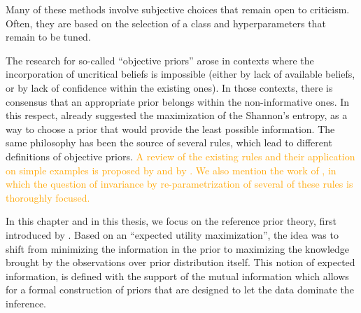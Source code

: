 Many of these  methods involve subjective choices that remain open to criticism. Often, they are based on the selection of a class and hyperparameters that remain to be tuned.

The research for so-called ``objective priors'' arose in contexts where the incorporation of uncritical beliefs is impossible (either by lack of available beliefs, or by lack of confidence within the existing ones).
In those contexts, there is consensus that an appropriate prior belongs within the non-informative ones. In this respect, \citet{lindley_measure_1956} already suggested the maximization of the Shannon's entropy, as a way to choose a prior that would provide the least possible information.
The same philosophy has been the source of several rules, which lead to different definitions of objective priors. \textcolor{orange}{A review of the  existing rules and their application on simple examples is proposed by \cite{kass_selection_1996} and by \citet{berger_overall_2015}. We also mention the work of  \citet{datta_invariance_1996}, in which the question of invariance by re-parametrization of several of these rules is thoroughly focused.}




In this chapter and in this thesis, we focus on the reference prior theory, first introduced by \citet{bernardo_expected_1979}. 
Based on an ``expected utility maximization'',
the idea was to shift from minimizing the information in the prior to maximizing the knowledge brought by the observations over prior distribution itself.
This notion of expected information, is defined with the support of the mutual information which allows for a formal construction of priors that are designed to let the data dominate the inference.

